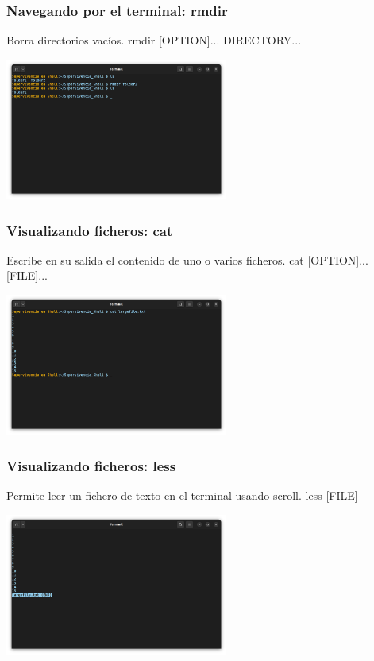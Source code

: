\documentclass[10pt]{beamer}
\begin{document}
	\begin{frame}
		\frametitle{Navegando por el terminal: rmdir}
		\begin{alertblock}{Borra directorios vacíos.}
			rmdir [OPTION]... DIRECTORY...
		\end{alertblock}
		\begin{center}
			\includegraphics[width=0.55\textwidth]{rmdir}
		\end{center}
	\end{frame}
	
	\begin{frame}
		\frametitle{Visualizando ficheros: cat}
		\begin{alertblock}{Escribe en su salida el contenido de uno o varios ficheros.}
			cat [OPTION]... [FILE]...
		\end{alertblock}
		\begin{center}
			\includegraphics[width=0.55\textwidth]{cat}
		\end{center}
	\end{frame}	
	
	\begin{frame}
		\frametitle{Visualizando ficheros: less}
		\begin{alertblock}{Permite leer un fichero de texto en el terminal usando scroll.}
			less [FILE]
		\end{alertblock}
		\begin{center}
			\includegraphics[width=0.55\textwidth]{less}
		\end{center}
	\end{frame}
		
\end{document}
